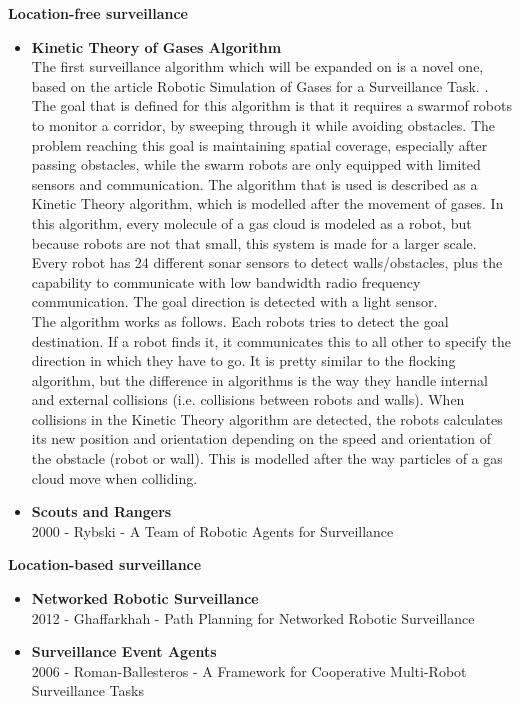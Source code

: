 \textbf{Location-free surveillance}
\begin{itemize}
\item \textbf{Kinetic Theory of Gases Algorithm}\\
The first surveillance algorithm which will be expanded on is a novel one, based on the article Robotic Simulation of Gases for a Surveillance Task. \cite{Kerr2005}.
The goal that is defined for this algorithm is that it requires a swarmof robots to monitor a corridor, by sweeping through it while avoiding obstacles. 
The problem reaching this goal is maintaining spatial coverage, especially after passing obstacles, while the swarm robots are only equipped with limited sensors and communication.
The algorithm that is used is described as a Kinetic Theory algorithm, which is modelled after the movement of gases. 
In this algorithm, every molecule of a gas cloud is modeled as a robot, but because robots are not that small, this system is made for a larger scale. 
Every robot has 24 different sonar sensors to detect walls/obstacles, plus the capability to communicate with low bandwidth radio frequency communication. 
The goal direction is detected with a light sensor.\\
The algorithm works as follows. Each robots tries to detect the goal destination. If a robot finds it, it communicates this to all other to specify the direction in which they have to go. 
It is pretty similar to the flocking algorithm, but the difference in algorithms is the way they handle internal and external collisions (i.e. collisions between robots and walls). 
When collisions in the Kinetic Theory algorithm are detected, the robots calculates its new position and orientation depending on the speed and orientation of the obstacle (robot or wall). 
This is modelled after the way particles of a gas cloud move when colliding. 
	
\item \textbf{Scouts and Rangers}\\
	2000 - Rybski - A Team of Robotic Agents for Surveillance
\end{itemize}

\textbf{Location-based surveillance}
\begin{itemize}
\item \textbf{Networked Robotic Surveillance}\\
	2012 - Ghaffarkhah - Path Planning for Networked Robotic Surveillance
\item \textbf{Surveillance Event Agents}\\
	2006 - Roman-Ballesteros - A Framework for Cooperative Multi-Robot Surveillance Tasks
\end{itemize}

